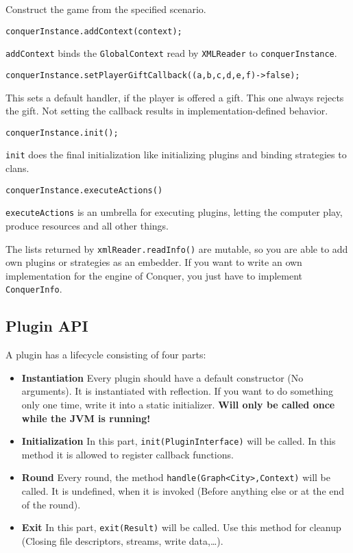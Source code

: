 \documentclass{article}
\begin{document}
    Construct the game from the specified scenario.
    \begin{verbatim}
conquerInstance.addContext(context);
    \end{verbatim}
    \texttt{addContext} binds the \texttt{GlobalContext} read by \texttt{XMLReader} to \texttt{conquerInstance}.
    \begin{verbatim}
conquerInstance.setPlayerGiftCallback((a,b,c,d,e,f)->false);
    \end{verbatim}
    This sets a default handler, if the player is offered a gift.
    This one always rejects the gift.
    Not setting the callback results in implementation-defined behavior.
    \begin{verbatim}
conquerInstance.init();
    \end{verbatim}
    \texttt{init} does the final initialization like initializing plugins and binding strategies to clans.
    \begin{verbatim}
conquerInstance.executeActions()
    \end{verbatim}
    \texttt{executeActions} is an umbrella for executing plugins, letting the computer play, produce resources and all other things.\newline

    The lists returned by \texttt{xmlReader.readInfo()} are mutable, so you are able to add own plugins or strategies as an embedder.\newline
    If you want to write an own implementation for the engine of Conquer, you just have to implement \texttt{ConquerInfo}.

    \subsection{Plugin API}
    A plugin has a lifecycle consisting of four parts:
    \begin{itemize}
        \item \textbf{Instantiation} Every plugin should have a default constructor (No arguments).
        It is instantiated with reflection.
        If you want to do something only one time, write it into a static initializer. \textbf{Will only be called once while the JVM is running!}
        \item \textbf{Initialization} In this part, \texttt{init(PluginInterface)} will be called.
        In this method it is allowed to register callback functions.
        \item \textbf{Round} Every round, the method \texttt{handle(Graph<City>,Context)} will be called.
        It is undefined, when it is invoked (Before anything else or at the end of the round).
        \item \textbf{Exit} In this part, \texttt{exit(Result)} will be called.
        Use this method for cleanup (Closing file descriptors, streams, write data,\ldots).

    \end{itemize}
\end{document}
